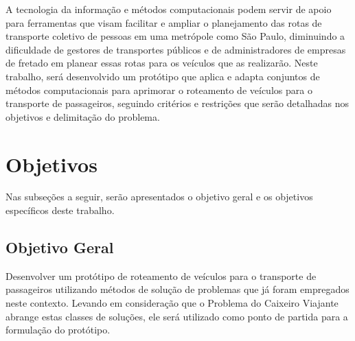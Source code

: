 A tecnologia da informação e métodos computacionais podem servir de apoio para ferramentas que visam facilitar e ampliar o planejamento das rotas de transporte coletivo de pessoas em uma metrópole como São Paulo, diminuindo a dificuldade de gestores de transportes públicos e de administradores de empresas de fretado em planear essas rotas para os veículos que as realizarão. Neste trabalho, será desenvolvido um protótipo que aplica e adapta conjuntos de métodos computacionais para aprimorar o roteamento de veículos para o transporte de passageiros, seguindo critérios e restrições que serão detalhadas nos objetivos e delimitação do problema.

\section{Objetivos}

Nas subseções a seguir, serão apresentados o objetivo geral e os objetivos específicos deste trabalho. 

\subsection{Objetivo Geral}

Desenvolver um protótipo de roteamento de veículos para o transporte de passageiros utilizando métodos de solução de problemas que já foram empregados neste contexto. Levando em consideração que o Problema do Caixeiro Viajante abrange estas classes de soluções, ele será utilizado como ponto de partida para a formulação do protótipo.

